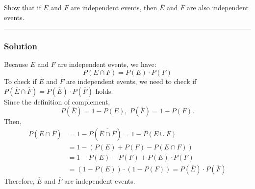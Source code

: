 \newpage
\begin{question}
Show that if $E$ and $F$ are independent events, then $\overline{E}$ and $\overline{F}$ are also independent events.
\end{question}

\par\noindent\rule{\textwidth}{0.5pt}

\subsubsection*{Solution}

Because $E$ and $F$ are independent events, we have: $$P(E \cap F) = P(E) \cdot P(F)$$
To check if $\overline{E}$ and $\overline{F}$ are independent events, we need to check if $P(\overline{E} \cap \overline{F}) = P(\overline{E}) \cdot P(\overline{F})$ holds. \\
Since the definition of complement, $$P(\overline{E}) = 1 - P(E), \; P(\overline{F}) = 1 - P(F).$$ Then,
\begin{align*}
P(\overline{E} \cap \overline{F})
&= 1 - P(\overline{\overline{E} \cap \overline{F}}) = 1 - P(E \cup F)\\
&= 1 - \left(P(E) + P(F) - P(E \cap F)\right)\\
&= 1 - P(E) - P(F) + P(E) \cdot P(F)\\
&= (1 - P(E)) \cdot (1 - P(F)) = P(\overline{E}) \cdot P(\overline{F})
\end{align*}
Therefore, $\overline{E}$ and $\overline{F}$ are independent events.